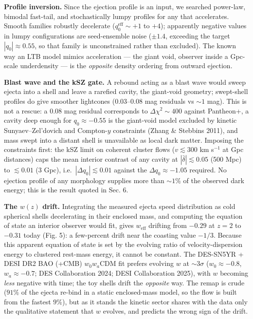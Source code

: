 \documentclass[
  11pt,
]{article}
\begin{document}
\textbf{Profile inversion.} Since the ejection profile is an input, we
searched power-law, bimodal fast-tail, and stochastically lumpy profiles
for any that accelerates. Smooth families robustly decelerate
(\(q_0^{\text{eff}} \sim +1\) to \(+4\)); apparently negative values in
lumpy configurations are seed-ensemble noise (\(\pm 1.4\), exceeding the
target \(|q_0| \approx 0.55\), so that family is unconstrained rather
than excluded). The known way an LTB model mimics acceleration --- the
giant void, observer inside a Gpc-scale underdensity --- is the
\emph{opposite} density ordering from outward ejection.

\textbf{Blast wave and the kSZ gate.} A rebound acting as a blast wave
would sweep ejecta into a shell and leave a rarefied cavity, the
giant-void geometry; swept-shell profiles do give smoother lightcones
(\(0.03\)--\(0.08\) mag residuals vs \(\sim\!1\) mag). This is not a
rescue: a \(0.08\) mag residual corresponds to \(\Delta\chi^2 \sim 400\)
against Pantheon+, a cavity deep enough for \(q_0 \approx -0.55\) is the
giant-void model excluded by kinetic Sunyaev--Zel'dovich and
Compton-\(y\) constraints (Zhang \& Stebbins 2011), and mass swept into
a distant shell is unavailable as local dark matter. Imposing the
constraints first: the kSZ limit on coherent cluster flows
(\(v \lesssim 300\) km s\(^{-1}\) at Gpc distances) caps the mean
interior contrast of any cavity at \(|\bar\delta| \lesssim 0.05\) (500
Mpc) to \(\lesssim 0.01\) (3 Gpc), i.e.~\(|\Delta q_0| \lesssim 0.01\)
against the \(\Delta q_0 \approx -1.05\) required. No ejection profile
of any morphology supplies more than \(\sim\!1\%\) of the observed dark
energy; this is the result quoted in Sec. 6.

\textbf{The \(w(z)\) drift.} Integrating the measured ejecta speed
distribution as cold spherical shells decelerating in their enclosed
mass, and computing the equation of state an interior observer would
fit, gives \(w_{\text{eff}}\) drifting from \(-0.29\) at \(z = 2\) to
\(-0.31\) today (Fig. 5): a few-percent drift near the coasting value
\(-1/3\). Because this apparent equation of state is set by the evolving
ratio of velocity-dispersion energy to clustered rest-mass energy, it
cannot be constant. The DES-SN5YR + DESI DR2 BAO (+CMB) \(w_0w_a\)CDM
fit prefers evolving \(w\) at \(\sim\!3\sigma\) (\(w_0 \approx -0.8\),
\(w_a \approx -0.7\); DES Collaboration 2024; DESI Collaboration 2025),
with \(w\) becoming \emph{less} negative with time; the toy shells drift
the \emph{opposite} way. The remap is crude (\(91\%\) of the ejecta
re-bind in a static enclosed-mass model, so the flow is built from the
fastest \(9\%\)), but as it stands the kinetic sector shares with the
data only the qualitative statement that \(w\) evolves, and predicts the
wrong sign of the drift.
\end{document}
